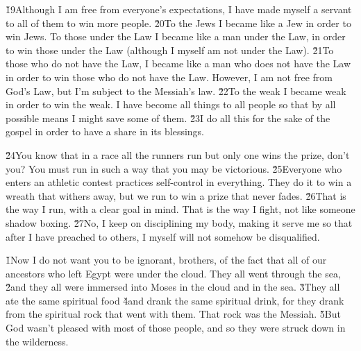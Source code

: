 \v{19}Although I am free from everyone's expectations, I have made myself a servant to all of them to win more people. \v{20}To the Jews I became like a Jew in order to win Jews. To those under the Law I became like a man under the Law, in order to win those under the Law (although I myself am not under the Law). \v{21}To those who do not have the Law, I became like a man who does not have the Law in order to win those who do not have the Law. However, I am not free from God's Law, but I'm subject to the Messiah's law. \v{22}To the weak I became weak in order to win the weak. I have become all things to all people so that by all possible means I might save some of them. \v{23}I do all this for the sake of the gospel in order to have a share in its blessings.

\v{24}You know that in a race all the runners run but only one wins the prize, don't you? You must run in such a way that you may be victorious. \v{25}Everyone who enters an athletic contest practices self-control in everything. They do it to win a wreath that withers away, but we run to win a prize that never fades. \v{26}That is the way I run, with a clear goal in mind. That is the way I fight, not like someone shadow boxing. \v{27}No, I keep on disciplining my body, making it serve me so that after I have preached to others, I myself will not somehow be disqualified.

\v{1}Now I do not want you to be ignorant, brothers, of the fact that all of our ancestors who left Egypt were under the cloud. They all went through the sea, \v{2}and they all were immersed into Moses in the cloud and in the sea. \v{3}They all ate the same spiritual food \v{4}and drank the same spiritual drink, for they drank from the spiritual rock that went with them. That rock was the Messiah. \v{5}But God wasn't pleased with most of those people, and so they were struck down in the wilderness.

